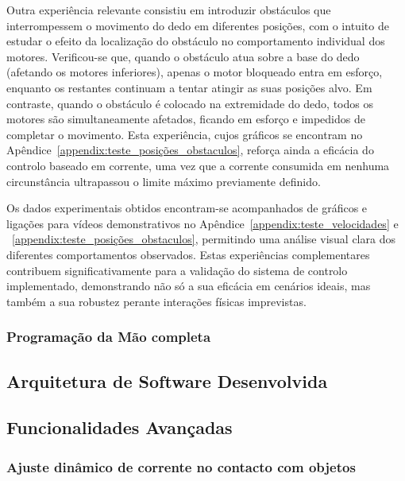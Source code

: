 Outra experiência relevante consistiu em introduzir obstáculos que interrompessem o movimento do dedo em diferentes posições, com o intuito de estudar o efeito da localização do obstáculo no comportamento individual dos motores. Verificou-se que, quando o obstáculo atua sobre a base do dedo (afetando os motores inferiores), apenas o motor bloqueado entra em esforço, enquanto os restantes continuam a tentar atingir as suas posições alvo. Em contraste, quando o obstáculo é colocado na extremidade do dedo, todos os motores são simultaneamente afetados, ficando em esforço e impedidos de completar o movimento. Esta experiência, cujos gráficos se encontram no Apêndice~\ref{appendix:teste_posições_obstaculos}, reforça ainda a eficácia do controlo baseado em corrente, uma vez que a corrente consumida em nenhuma circunstância ultrapassou o limite máximo previamente definido.

Os dados experimentais obtidos encontram-se acompanhados de gráficos e ligações para vídeos demonstrativos no Apêndice~\ref{appendix:teste_velocidades} e ~\ref{appendix:teste_posições_obstaculos}, permitindo uma análise visual clara dos diferentes comportamentos observados. Estas experiências complementares contribuem significativamente para a validação do sistema de controlo implementado, demonstrando não só a sua eficácia em cenários ideais, mas também a sua robustez perante interações físicas imprevistas.







\subsubsection{Programação da Mão completa}



\subsection{Arquitetura de Software Desenvolvida}



\subsection{Funcionalidades Avançadas}

\subsubsection{Ajuste dinâmico de corrente no contacto com objetos}

